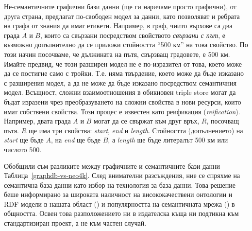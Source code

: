 Не-семантичните графични бази данни (ще ги наричаме просто графични), от друга страна, предлагат по-свободен модел за данни, като позволяват и ребрата на графа от знания да имат етикети. Например, в граф, чиито върхове са два града $A$ и $B$, които са свързани посредством свойството \emph {свързани с път}, е възможно допълнително да се приложи стойността ``500 км'' на това свойство. По този начин посочваме, че дължината на пътя, свързващ градовете, е 500 км. Имайте предвид, че този разширен модел не е по-изразител от това, което може да се постигне само с тройки. Т.е. няма твърдение, което може да бъде изказано с разширения модел, а да не може да бъде изказано посредством семантичния модел. Всъщност, сложни взаимоотношения в обикновен triple store могат да бъдат изразени чрез преобразуването на сложни свойства в нови ресурси, които имат собствени свойства. Този процес е известен като реификация (\emph{reification}). Например, двата града $A$ и $B$ могат да се свържат към друг връх, $R$, посочващ пътя. $R$ ще има три свойства: \emph{start}, \emph{end} и \emph{length}. Стойността (допълнението) на \emph{start} ще бъде $A$, на \emph{end} ще бъде $B$, а \emph{length} ще бъде литералът 500 км или числото 500.

Обобщили съм разликите между графичните и семантичните бази данни Таблица~\ref {graphdb-vs-neo4k}. След внимателни разсъждения, ние се спряхме на семантична база данни като избор на технология за база данни. Това решение беше информирано за широката наличност на висококачествени онтологии и RDF модели в нашата област (\cite{baskauf_darwin-sw:_2016, peroni_semantic_2014}) и популярността на семантичната мрежа (\cite{berners-lee_semantic_2001}) в общността. Освен това разположението ни в издателска къща ни подтикна към стандартизиран проект, а не към частен случай.

